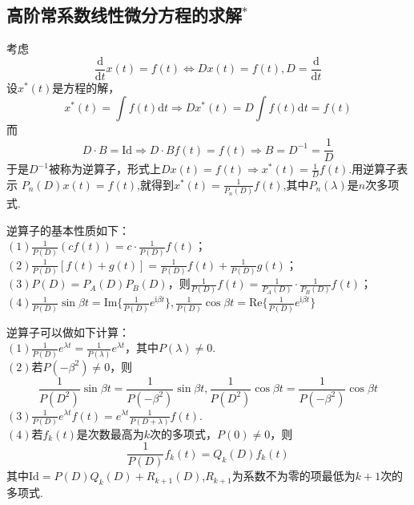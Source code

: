 \documentclass{ctexart}
\begin{document}
\subsection{高阶常系数线性微分方程的求解$^{*}$}
考虑
$$\frac{\mathrm{d}}{\mathrm{d}t}x(t)=f(t)\Leftrightarrow Dx(t)=f(t),D=\frac{\mathrm{d}}{\mathrm{d}t}$$
设$x^{*}(t)$是方程的解，
$$x^{*}(t)=\int{f(t)\mathrm{d}t}\Rightarrow Dx^{*}(t)=D\int{f(t)\mathrm{d}t}=f(t)$$
而
$$D\cdot B=\mathrm{Id}\Rightarrow D\cdot Bf(t)=f(t)\Rightarrow B=D^{-1}=\frac{1}{D}$$
于是$D^{-1}$被称为逆算子，形式上$Dx(t)=f(t)\Rightarrow x^{*}(t)=\frac{1}{D}f(t)$.用逆算子表示
$P_{n}(D)x(t)=f(t)$,就得到$x^{*}(t)=\frac{1}{P_{n}(D)}f(t)$,其中$P_{n}(\lambda)$是$n$次多项式.

\begin{theorem}[逆算子的基本性质]
逆算子的基本性质如下：\\
$(1)\frac{1}{P(D)}(cf(t))=c\cdot \frac{1}{P(D)}f(t)$；\\
$(2)\frac{1}{P(D)}\left[f(t)+g(t)\right]=\frac{1}{P(D)}f(t)+\frac{1}{P(D)}g(t)$；\\
$(3)P(D)=P_{A}(D)P_{B}(D)$，则$\frac{1}{P(D)}f(t)=\frac{1}{P_{A}(D)}\cdot\frac{1}{P_{B}(D)}f(t)$；\\
$(4)\frac{1}{P(D)}\sin{\beta t}=\mathrm{Im}\{\frac{1}{P(D)}e^{\mathrm{i}\beta t}\},\frac{1}{P(D)}\cos{\beta t}=\mathrm{Re}\{\frac{1}{P(D)}e^{\mathrm{i}\beta t}\}$
\end{theorem}

\begin{theorem}[逆算子公式]
逆算子可以做如下计算：\\
$(1)\frac{1}{P(D)}e^{\lambda t}=\frac{1}{P(\lambda)}e^{\lambda t}$，其中$P(\lambda)\neq 0$.\\
$(2)$若$P(-\beta^{2})\neq 0$，则
$$\frac{1}{P(D^{2})}\sin{\beta t}=\frac{1}{P(-\beta^{2})}\sin{\beta t},\frac{1}{P(D^{2})}\cos{\beta t}=\frac{1}{P(-\beta^{2})}\cos{\beta t}$$
$(3)\frac{1}{P(D)}e^{\lambda t}f(t)=e^{\lambda t}\frac{1}{P(D+\lambda)}f(t)$.\\
$(4)$若$f_{k}(t)$是次数最高为$k$次的多项式，$P(0)\neq 0$，则
$$\frac{1}{P(D)}f_{k}(t)=Q_{k}(D)f_{k}(t)$$
其中$\mathrm{Id}=P(D)Q_{k}(D)+R_{k+1}(D)$,$R_{k+1}$为系数不为零的项最低为$k+1$次的多项式.
\end{theorem}
\end{document}
